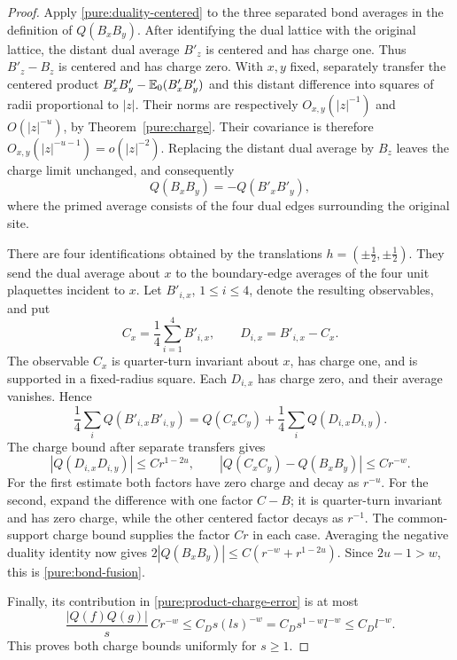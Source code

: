 \begin{proof}
Apply \eqref{pure:duality-centered} to the three separated bond averages
in the definition of $Q(B_xB_y)$.  After identifying the dual lattice
with the original lattice, the distant dual average $B'_z$ is centered
and has charge one.  Thus $B'_z-B_z$ is centered and has charge zero.
With $x,y$ fixed, separately transfer the centered product
$B'_xB'_y-\mathbb E_0(B'_xB'_y)$ and this distant difference into squares of
radii proportional to $|z|$.  Their norms are respectively
$O_{x,y}(|z|^{-1})$ and $O(|z|^{-u})$, by
Theorem~\ref{pure:charge}.  Their covariance is therefore
$O_{x,y}(|z|^{-u-1})=o(|z|^{-2})$.  Replacing the distant dual average
by $B_z$ leaves the charge limit unchanged, and consequently
\[
 Q(B_xB_y)=-Q(B'_xB'_y),
\]
where the primed average consists of the four dual edges surrounding the
original site.

There are four identifications obtained by the translations
$h=(\pm\frac12,\pm\frac12)$.  They send the dual average about $x$
to the boundary-edge averages of the four unit plaquettes incident to $x$.
Let $B'_{i,x}$, $1\leq i\leq4$, denote the resulting observables, and put
\[
 C_x=\frac14\sum_{i=1}^4B'_{i,x},\qquad D_{i,x}=B'_{i,x}-C_x.
\]
The observable $C_x$ is quarter-turn invariant about $x$, has charge one,
and is supported in a fixed-radius square.  Each $D_{i,x}$ has charge zero,
and their average vanishes.  Hence
\[
 \frac14\sum_iQ(B'_{i,x}B'_{i,y})
   =Q(C_xC_y)+\frac14\sum_iQ(D_{i,x}D_{i,y}).
\]
The charge bound after separate transfers gives
\[
 |Q(D_{i,x}D_{i,y})|\leq Cr^{1-2u},\qquad
 |Q(C_xC_y)-Q(B_xB_y)|\leq Cr^{-w}.
\]
For the first estimate both factors have zero charge and decay as $r^{-u}$.
For the second, expand the difference with one factor $C-B$; it is
quarter-turn invariant and has zero charge, while the other centered
factor decays as $r^{-1}$.  The common-support charge bound supplies the
factor $Cr$ in each case.  Averaging the negative duality identity now
gives $2|Q(B_xB_y)|\leq C(r^{-w}+r^{1-2u})$.  Since $2u-1>w$, this is
\eqref{pure:bond-fusion}.

Finally, its contribution in \eqref{pure:product-charge-error} is at most
\[
 \frac{|Q(f)Q(g)|}{s}\,Cr^{-w}
       \leq C_Ds(ls)^{-w}
       =C_Ds^{1-w}l^{-w}\leq C_Dl^{-w}.
\]
This proves both charge bounds uniformly for $s\geq1$.
\end{proof}

